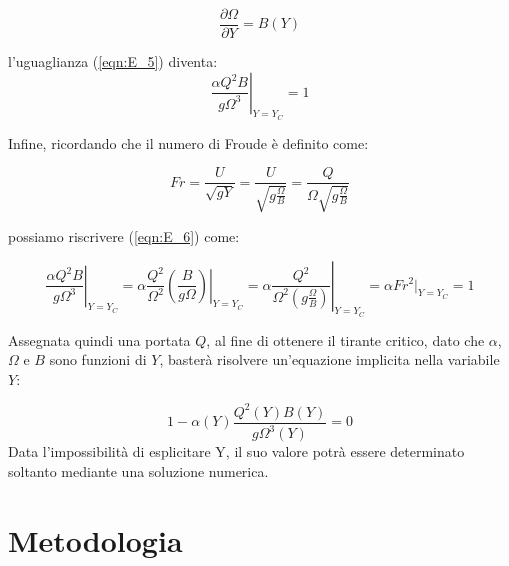 \documentclass[12pt]{article} %
\begin{document}
\begin{equation}
    \frac{\partial \Omega}{\partial Y}=B(Y)
    \label{eqn:B}
\end{equation}

\noindent l’uguaglianza (\ref{eqn:E_5}) diventa:
\begin{equation}
    \left.\frac{\alpha Q^{2}B}{g\Omega^{3}}\right|_{Y=Y_{C}}=1
    \label{eqn:E_6}
\end{equation}

\noindent Infine, ricordando che il numero di Froude è definito come:

\begin{equation}
    Fr=\frac{U}{\sqrt{gY}}=\frac{U}{\sqrt{g\frac{\Omega}{B}}}=\frac{Q}{\Omega \sqrt{g\frac{\Omega}{B}}}
    \label{eqn:Froude}
\end{equation}

\noindent possiamo riscrivere (\ref{eqn:E_6}) come:

\begin{equation}
    \left.\frac{\alpha Q^{2}B}{g\Omega^{3}}\right|_{Y=Y_C}=\alpha \frac {Q^{2}}{\Omega^{2}}\left.\left(\frac{B}{g\Omega}\right)\right|_{Y=Y_C}=\alpha\left.\frac {Q^{2}}{\Omega^{2}\left(g\frac{\Omega}{B}\right)}\right|_{Y=Y_{C}}=\alpha Fr^{2}|_{Y=Y_C}=1
    \label{eqn:E_7}
\end{equation}

\noindent Assegnata quindi una portata $Q$, al fine di ottenere il tirante critico, dato che $\alpha$, $\Omega$ e $B$ sono funzioni di $Y$, basterà risolvere un’equazione implicita nella variabile $Y$:

\begin{equation}
    1-\alpha(Y)\frac{Q^{2}(Y)B(Y)}{g\Omega^{3}(Y)}=0
    \label{eqn:E_8}
\end{equation}
\noindent Data l'impossibilità di esplicitare Y, il suo valore potrà essere determinato soltanto mediante una soluzione numerica.

\newpage
\section{Metodologia}
\end{document}
